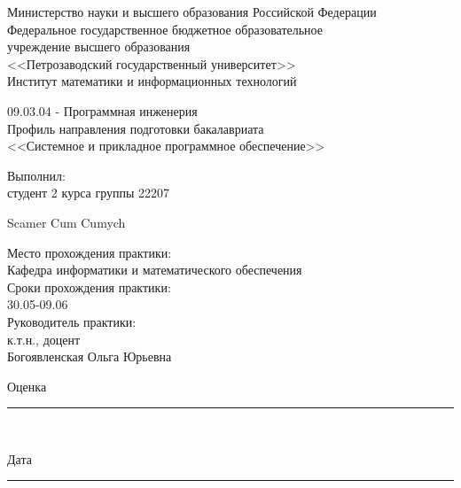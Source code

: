 \documentclass[a4paper,12pt]{article}
\newcommand{\myrule}[1]{\rule{#1}{0.4pt}}
\newcommand{\sign}[2][~]{{\small\myrule{#2}\\[-0.7em]\makebox[#2]{\it #1}}}
\renewcommand{\baselinestretch}{1.50}
\begin{document}
\thispagestyle{empty}
\begin{center}
\renewcommand{\baselinestretch}{1}
{\normalsize {Министерство науки и высшего образования Российской Федерации\\
Федеральное государственное бюджетное образовательное\\
учреждение высшего образования\\}
\large
{\sc <<Петрозаводский государственный университет>>\\
Институт математики и информационных технологий
}
}
\end{center}


\begin{center}
09.03.04 - Программная инженерия\\
Профиль направления подготовки бакалавриата\\
<<Системное и прикладное программное обеспечение>>\\
\end{center}

\vfill

\begin{center}
\medskip
	{\Large {}}
\end{center}

\vfill
\vfill
\vfill

\medskip

\begin{flushright}
\parbox{9cm}{%
\renewcommand{\baselinestretch}{1.2}
\normalsize
	Выполнил:\\
студент 2 курса группы 22207
\begin{flushright}
Scamer Cum Cumych
\end{flushright}
Место прохождения практики: \\
Кафедра информатики и математического обеспечения\\

Сроки прохождения практики: \\
30.05-09.06\\

Руководитель практики:\\
к.т.н., доцент\\
Богоявленская Ольга Юрьевна\\

\begin{flushright}
Оценка
  \sign[]{4cm}
\end{flushright}

\begin{flushright}
Дата
  \sign[]{4cm}
\end{flushright}
}
\end{flushright}
\end{document}
